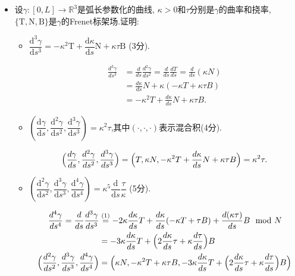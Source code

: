 \begin{itemize}
    \item[1.]设$\gamma:[0,L]\to\mathbb{R}^3$是弧长参数化的曲线, $\kappa>0$和$\tau$分别是$\gamma$的曲率和挠率, $\{\mathrm{T},\mathrm{N},\mathrm{B}\}$是$\gamma$的Frenet标架场.证明:
    \begin{itemize}
        \item[(1)]$\dfrac{\mathrm{d}^3\gamma}{\mathrm{d}s^3}=-\kappa^2 \mathrm{T}+\dfrac{\mathrm{d}\kappa}{\mathrm{d}s}\mathrm{N}+\kappa\tau \mathrm{B}$ (3分).
        \begin{proofc}
            \begin{align*}
                \frac{d^{3}\gamma}{ds^{3}}&=\frac{d}{ds}\frac{d^{2}\gamma}{ds^{2}}=\frac{d}{ds}\frac{dT}{ds}=\frac{d}{ds}(\kappa N)\\
                &=\frac{d\kappa}{ds}N+\kappa(-\kappa T+\kappa\tau B)\\
                &=-\kappa^{2}T+\frac{d\kappa}{ds}N+\kappa\tau B.
            \end{align*}
        \end{proofc}
        \item[(2)]$\left( \dfrac{\mathrm{d}\gamma}{\mathrm{d} s},\dfrac{\mathrm{d}^2\gamma}{\mathrm{d}s^2},\dfrac{\mathrm{d}^3\gamma}{\mathrm{d}s^3} \right)=\kappa^2\tau$,其中$(\cdot,\cdot,\cdot)$表示混合积(4分).
        \begin{proofc}
            $$
                \Bigl( \frac{d\gamma}{ds},\frac{d^{2}\gamma}{ds^{2}},\frac{d^{3}\gamma}{ds^{3}} \Bigr)=\Bigl( T,\kappa N,-\kappa^{2}T+\frac{d\kappa}{ds}N+\kappa\tau B \Bigr)=\kappa^{2}\tau.
            $$
        \end{proofc}
        \item[(3)]$\left( \dfrac{\mathrm{d}^2\gamma}{\mathrm{d}s^2},\dfrac{\mathrm{d}^3\gamma}{\mathrm{d}s^3}, \dfrac{\mathrm{d}^4\gamma}{\mathrm{d}s^4}\right)={\kappa^5}\dfrac{\mathrm{d}}{\mathrm{d}s}\dfrac{\tau}{\kappa}$ (5分).
        \begin{proofc}
            \begin{align*}
                \frac{d^{4}\gamma}{ds^{4}}=\frac{d}{ds}\frac{d^{3}\gamma}{ds^{3}}&\overset{(1)}{=}-2\kappa\frac{d\kappa}{ds}T+\frac{d\kappa}{ds}(-\kappa T+\tau B)+\frac{d(\kappa\tau)}{ds}B \mod N\\
                &=-3\kappa\frac{d\kappa}{ds}T+\Bigl( 2\frac{d\kappa}{ds}\tau+\kappa\frac{d\tau}{ds} \Bigr)B\\
                \Bigl( \frac{d^{2}\gamma}{ds^{2}},\frac{d^{3}\gamma}{ds^{3}},\frac{d^{4}\gamma}{ds^{4}} \Bigr)&=\Bigl( \kappa N,-\kappa^{2}T+\kappa\tau B,-3\kappa\frac{d\kappa}{ds}T+\Bigl( 2\frac{d\kappa}{ds}\tau+\kappa\frac{d\tau}{ds} \Bigr) B\Bigr)\\

\end{align*}
\end{proofc}
\end{itemize}
\end{itemize}
